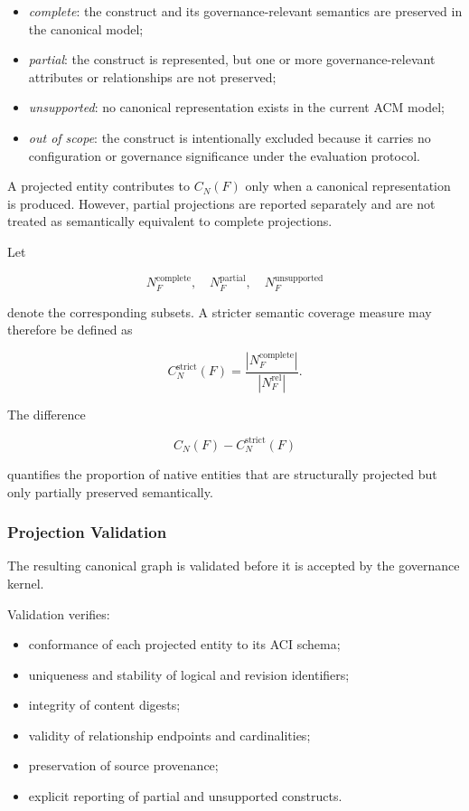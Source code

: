 \documentclass[10pt]{article}
\begin{document}
\begin{itemize}
    \item \emph{complete}: the construct and its governance-relevant semantics
    are preserved in the canonical model;
    \item \emph{partial}: the construct is represented, but one or more
    governance-relevant attributes or relationships are not preserved;
    \item \emph{unsupported}: no canonical representation exists in the current
    ACM model;
    \item \emph{out of scope}: the construct is intentionally excluded because
    it carries no configuration or governance significance under the evaluation
    protocol.
\end{itemize}

A projected entity contributes to $C_N(F)$ only when a canonical representation
is produced. However, partial projections are reported separately and are not
treated as semantically equivalent to complete projections.

Let

\[
N_F^{\mathrm{complete}},
\quad
N_F^{\mathrm{partial}},
\quad
N_F^{\mathrm{unsupported}}
\]

denote the corresponding subsets. A stricter semantic coverage measure may
therefore be defined as

\[
C_N^{\mathrm{strict}}(F)
=
\frac{
|N_F^{\mathrm{complete}}|
}{
|N_F^{\mathrm{rel}}|
}.
\tag{49}
\]

The difference

\[
C_N(F)-C_N^{\mathrm{strict}}(F)
\]

quantifies the proportion of native entities that are structurally projected
but only partially preserved semantically.

\subsubsection{Projection Validation}

The resulting canonical graph is validated before it is accepted by the
governance kernel.

Validation verifies:

\begin{itemize}
    \item conformance of each projected entity to its ACI schema;
    \item uniqueness and stability of logical and revision identifiers;
    \item integrity of content digests;
    \item validity of relationship endpoints and cardinalities;
    \item preservation of source provenance;
    \item explicit reporting of partial and unsupported constructs.
\end{itemize}
\end{document}

